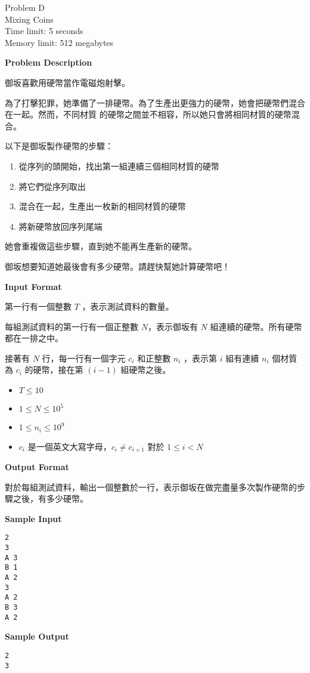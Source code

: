 \begin{center}
    {\LARGE Problem D}\vspace{1mm}\\
    {\Large Mixing Coins}\\
    {Time limit: 5 seconds}\\
    {Memory limit: 512 megabytes}
\end{center}

\textbf{\large Problem Description}

御坂喜歡用硬幣當作電磁炮射擊。

為了打擊犯罪，她準備了一排硬幣。為了生產出更強力的硬幣，她會把硬幣們混合在一起。然而，不同材質
的硬幣之間並不相容，所以她只會將相同材質的硬幣混合。

以下是御坂製作硬幣的步驟：

\begin{enumerate}
    \item 從序列的頭開始，找出第一組連續三個相同材質的硬幣
    \item 將它們從序列取出
    \item 混合在一起，生產出一枚新的相同材質的硬幣
    \item 將新硬幣放回序列尾端
\end{enumerate}

她會重複做這些步驟，直到她不能再生產新的硬幣。

御坂想要知道她最後會有多少硬幣。請趕快幫她計算硬幣吧！

\textbf{\large Input Format}

第一行有一個整數 $T$ ，表示測試資料的數量。

每組測試資料的第⼀⾏有一個正整數 $N$，表⽰御坂有 $N$ 組連續的硬幣。所有硬幣都在一排之中。

接著有 $N$ 行，每一行有一個字元 $c_i$ 和正整數 $n_i$ ，表示第 $i$ 組有連續 $n_i$ 個材質
為 $c_i$ 的硬幣，接在第 $(i-1)$ 組硬幣之後。

\begin{itemize}
    \tightlist{}
    \item $T \leq 10$
    \item $1 \leq N \leq 10^5$
    \item $1 \leq n_i \leq 10^9$
    \item $c_i$ 是一個英文大寫字母，$c_i \neq c_{i+1}$ 對於 $1 \leq i < N$
\end{itemize}

\textbf{\large Output Format}

對於每組測試資料，輸出一個整數於一行，表示御坂在做完盡量多次製作硬幣的步驟之後，有多少硬幣。

\textbf{\large Sample Input}

\begin{verbatim}
2
3
A 3
B 1
A 2
3
A 2
B 3
A 2
\end{verbatim}

\textbf{\large Sample Output}
\begin{verbatim}
2
3
\end{verbatim}

